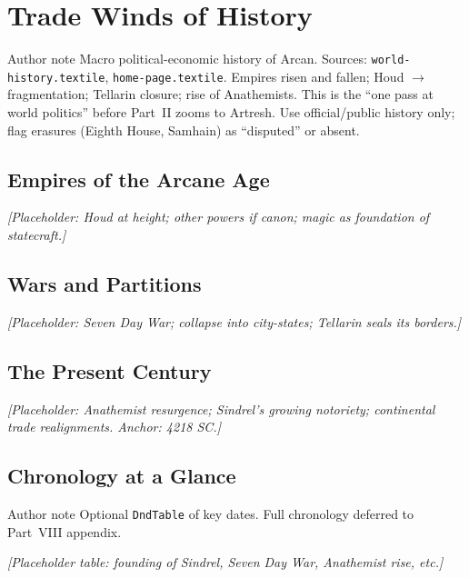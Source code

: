 \chapter{Trade Winds of History}

\begin{DndComment}{Author note}
  Macro political-economic history of Arcan. Sources: \texttt{world-history.textile}, \texttt{home-page.textile}.
  Empires risen and fallen; Houd $\rightarrow$ fragmentation; Tellarin closure; rise of Anathemists.
  This is the ``one pass at world politics'' before Part~II zooms to Artresh.
  Use official/public history only; flag erasures (Eighth House, Samhain) as ``disputed'' or absent.
\end{DndComment}

\section{Empires of the Arcane Age}

\textit{[Placeholder: Houd at height; other powers if canon; magic as foundation of statecraft.]}

\section{Wars and Partitions}

\textit{[Placeholder: Seven Day War; collapse into city-states; Tellarin seals its borders.]}

\section{The Present Century}

\textit{[Placeholder: Anathemist resurgence; Sindrel's growing notoriety; continental trade realignments. Anchor: 4218 SC.]}

\section{Chronology at a Glance}

\begin{DndComment}{Author note}
  Optional \texttt{DndTable} of key dates. Full chronology deferred to Part~VIII appendix.
\end{DndComment}

\textit{[Placeholder table: founding of Sindrel, Seven Day War, Anathemist rise, etc.]}
